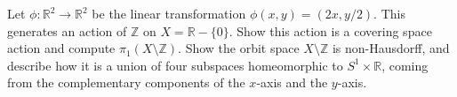 \documentclass[12pt]{article}
\begin{document}
\begin{newproof}

\end{newproof}

\begin{statement}
  Let $\phi: \mathbb{R}^2 \to \mathbb{R}^2$ be the linear transformation $\phi(x,y)=(2x,y/2)$. This generates 
  an action of $\mathbb{Z}$ on $X = \mathbb{R} - \{0\}$. Show this action is a covering space action and 
  compute $\pi_1(X \setminus \mathbb{Z})$. Show the orbit space $X \setminus \mathbb{Z}$ is 
  non-Hausdorff, and describe how it is a union of four subspaces homeomorphic to $S^1 \times \mathbb{R}$, coming 
  from the complementary components of the $x$-axis and the $y$-axis. 
\end{statement}

\begin{newproof}

\end{newproof}


\begin{newproof}

\end{newproof}

\begin{statement}

\end{statement}

\begin{newproof}

\end{newproof}
\end{document}
